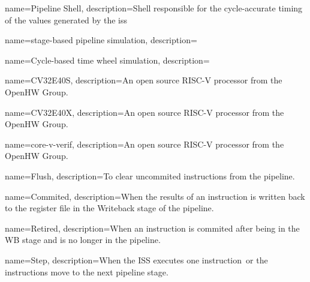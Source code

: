 

\makeglossaries %


{
    name=Pipeline Shell,
    description=Shell responsible for the cycle-accurate timing of the values generated by the \acrshort{iss}
}

{
    name=stage-based pipeline simulation,
    description=
}

{
    name=Cycle-based time wheel simulation,
    description=
}

{
    name=CV32E40S,
    description=An open source RISC-V processor from the OpenHW Group.
}

{
    name=CV32E40X,
    description=An open source RISC-V processor from the OpenHW Group.
}

{
    name=core-v-verif,
    description=An open source RISC-V processor from the OpenHW Group.
}


{
    name=Flush,
    description=To clear uncommited instructions from the pipeline. 
}

{
    name=Commited,
    description=When the results of an instruction is written back to the register file in the Writeback stage of the pipeline.
}

{
    name=Retired,
    description=When an instruction is \gls{commited} after being in the WB stage and is no longer in the pipeline.
}

{
    name=Step,
    description=When the ISS executes one instruction\, or the instructions move to the next pipeline stage.
}



